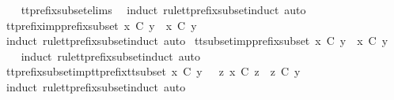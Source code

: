\begin{isabellebody}
%
\isadelimproof
\ \ %
\endisadelimproof
%
\isatagproof
{}\isamarkupfalse%
\ tt{\isacharunderscore}prefix{\isacharunderscore}subset{\isachardot}elims{\isacharparenleft}{}{\isacharparenright}\ \isamarkupfalse%
\ {\isacharparenleft}induct\ rule{\isacharcolon}tt{\isacharunderscore}prefix{\isacharunderscore}subset{\isachardot}induct{\isacharcomma}\ auto{\isacharparenright}%
\endisatagproof
{\isafoldproof}%
%
\isadelimproof
\isanewline
%
\endisadelimproof
\isanewline
{}\isamarkupfalse%
\ tt{\isacharunderscore}prefix{\isacharunderscore}imp{\isacharunderscore}prefix{\isacharunderscore}subset{\isacharcolon}\ {\isachardoublequoteopen}x\ {\isasymle}\isactrlsub C\ y\ {\isasymLongrightarrow}\ x\ {\isasymlesssim}\isactrlsub C\ y{\isachardoublequoteclose}\isanewline
%
\isadelimproof
\ \ %
\endisadelimproof
%
\isatagproof
{}\isamarkupfalse%
\ {\isacharparenleft}induct\ rule{\isacharcolon}tt{\isacharunderscore}prefix{\isacharunderscore}subset{\isachardot}induct{\isacharcomma}\ auto{\isacharparenright}%
\endisatagproof
{\isafoldproof}%
%
\isadelimproof
\isanewline
%
\endisadelimproof
\isanewline
{}\isamarkupfalse%
\ tt{\isacharunderscore}subset{\isacharunderscore}imp{\isacharunderscore}prefix{\isacharunderscore}subset{\isacharcolon}\ {\isachardoublequoteopen}x\ {\isasymsubseteq}\isactrlsub C\ y\ {\isasymLongrightarrow}\ x\ {\isasymlesssim}\isactrlsub C\ y{\isachardoublequoteclose}\isanewline
%
\isadelimproof
\ \ %
\endisadelimproof
%
\isatagproof
{}\isamarkupfalse%
\ {\isacharparenleft}induct\ rule{\isacharcolon}tt{\isacharunderscore}prefix{\isacharunderscore}subset{\isachardot}induct{\isacharcomma}\ auto{\isacharparenright}%
\endisatagproof
{\isafoldproof}%
%
\isadelimproof
\isanewline
%
\endisadelimproof
\isanewline
{}\isamarkupfalse%
\ tt{\isacharunderscore}prefix{\isacharunderscore}subset{\isacharunderscore}imp{\isacharunderscore}tt{\isacharunderscore}prefix{\isacharunderscore}tt{\isacharunderscore}subset{\isacharcolon}\ {\isachardoublequoteopen}x\ {\isasymlesssim}\isactrlsub C\ y\ {\isasymLongrightarrow}\ {\isasymexists}\ z{\isachardot}\ x\ {\isasymle}\isactrlsub C\ z\ {\isasymand}\ z\ {\isasymsubseteq}\isactrlsub C\ y{\isachardoublequoteclose}\isanewline
%
\isadelimproof
\ \ %
\endisadelimproof
%
\isatagproof
{}\isamarkupfalse%
\ {\isacharparenleft}induct\ rule{\isacharcolon}tt{\isacharunderscore}prefix{\isacharunderscore}subset{\isachardot}induct{\isacharcomma}\ auto{\isacharparenright}\isanewline
\ \ \isamarkupfalse%

\end{isabellebody}
